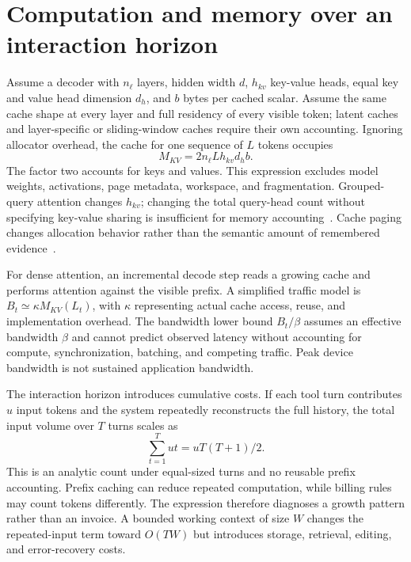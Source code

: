 \section{Computation and memory over an interaction horizon}\label{sec:C11:resources}
Assume a decoder with $n_\ell$ layers, hidden width $d$, $h_{kv}$ key-value heads, equal key and value head dimension $d_h$, and $b$ bytes per cached scalar. Assume the same cache shape at every layer and full residency of every visible token; latent caches and layer-specific or sliding-window caches require their own accounting. Ignoring allocator overhead, the cache for one sequence of $L$ tokens occupies
\begin{equation}
 M_{KV}=2n_\ell Lh_{kv}d_h b.
 \label{eq:C11:kv}
\end{equation}
The factor two accounts for keys and values. This expression excludes model weights, activations, page metadata, workspace, and fragmentation. Grouped-query attention changes $h_{kv}$; changing the total query-head count without specifying key-value sharing is insufficient for memory accounting~\cite{ainslie2023gqa}. Cache paging changes allocation behavior rather than the semantic amount of remembered evidence~\cite{kwon2023pagedattention}.

For dense attention, an incremental decode step reads a growing cache and performs attention against the visible prefix. A simplified traffic model is $B_t\simeq\kappa M_{KV}(L_t)$, with $\kappa$ representing actual cache access, reuse, and implementation overhead. The bandwidth lower bound $B_t/\beta$ assumes an effective bandwidth $\beta$ and cannot predict observed latency without accounting for compute, synchronization, batching, and competing traffic. Peak device bandwidth is not sustained application bandwidth.

The interaction horizon introduces cumulative costs. If each tool turn contributes $u$ input tokens and the system repeatedly reconstructs the full history, the total input volume over $T$ turns scales as
\begin{equation}
 \sum_{t=1}^{T}ut=uT(T+1)/2.
\end{equation}
This is an analytic count under equal-sized turns and no reusable prefix accounting. Prefix caching can reduce repeated computation, while billing rules may count tokens differently. The expression therefore diagnoses a growth pattern rather than an invoice. A bounded working context of size $W$ changes the repeated-input term toward $O(TW)$ but introduces storage, retrieval, editing, and error-recovery costs.

